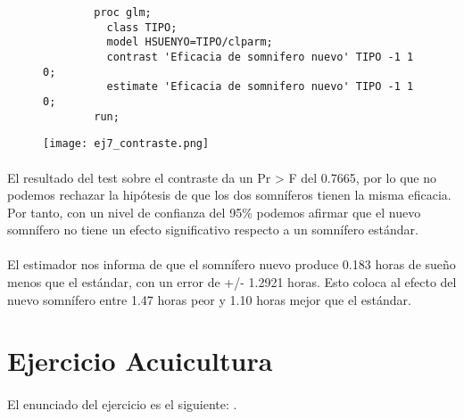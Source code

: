 \documentclass{article}
\begin{document}
    \begin{figure}[h]
      \centering
      \begin{verbatim}
        proc glm;
          class TIPO;
          model HSUENYO=TIPO/clparm;
          contrast 'Eficacia de somnifero nuevo' TIPO -1 1 0;
          estimate 'Eficacia de somnifero nuevo' TIPO -1 1 0;
        run;
      \end{verbatim}
      \label{code:sas_2}
    \end{figure}


    \begin{figure}[H]
      \centering
      \texttt{[image: ej7\_contraste.png]}
    \end{figure}

    \paragraph{}
    El resultado del test sobre el contraste da un Pr > F del 0.7665, por lo que no podemos rechazar la hipótesis de que los dos somníferos tienen la misma eficacia. Por tanto, con un nivel de confianza del 95\% podemos afirmar que el nuevo somnífero no tiene un efecto significativo respecto a un somnífero estándar.

    \paragraph{}
    El estimador nos informa de que el somnífero nuevo produce 0.183 horas de sueño menos que el estándar, con un error de +/- 1.2921 horas. Esto coloca al efecto del nuevo somnífero entre 1.47 horas peor y 1.10 horas mejor que el estándar.

  \section{Ejercicio Acuicultura}

    \paragraph{}
    El enunciado del ejercicio es el siguiente: .
\end{document}
